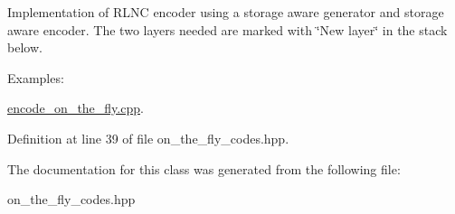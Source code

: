 Implementation of R\-L\-N\-C encoder using a storage aware generator and storage aware encoder. The two layers needed are marked with \char`\"{}\-New layer\char`\"{} in the stack below. \begin{Desc}
\item[Examples\-: ]\par
\hyperlink{encode_on_the_fly_8cpp-example}{encode\-\_\-on\-\_\-the\-\_\-fly.\-cpp}.\end{Desc}


Definition at line 39 of file on\-\_\-the\-\_\-fly\-\_\-codes.\-hpp.



The documentation for this class was generated from the following file\-:\begin{DoxyCompactItemize}
\item 
on\-\_\-the\-\_\-fly\-\_\-codes.\-hpp\end{DoxyCompactItemize}
